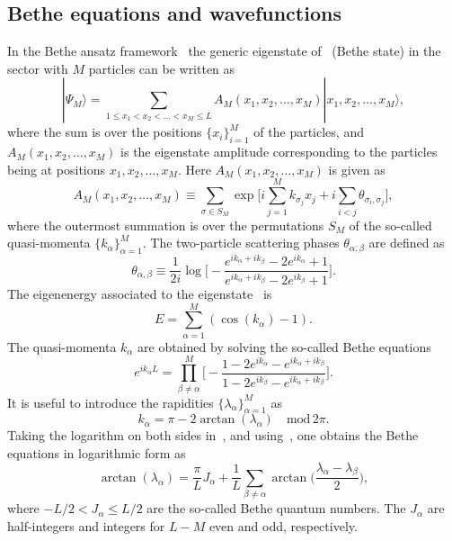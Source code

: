 \documentclass[11pt]{iopart}
\begin{document}
\subsection{Bethe equations and wavefunctions}
\label{sec:1.2}


In the Bethe ansatz framework~\cite{bethe-1931,taka-book} the generic eigenstate 
of~ (Bethe state) in the sector with $M$ particles can be written as 
%
\begin{equation}
\label{ba-eig}
|\Psi_M\rangle=\sum\limits_{1\le x_1<x_2<\dots<x_M\le L}A_M(x_1,x_2,
\dots,x_M)|x_1,x_2,\dots,x_M\rangle,
\end{equation}
%
where the sum is over the positions $\{x_i\}_{i=1}^M$ of the particles, and $A_M(x_1,
x_2,\dots,x_M)$ is the eigenstate amplitude corresponding to the particles 
being at positions $x_1,x_2,\dots, x_M$. Here $A_M(x_1,x_2,\dots, x_M)$ is 
given as 
%
\begin{equation}
\label{ba_amp}
A_M(x_1,x_2,\dots,x_M)\equiv\sum\limits_{\sigma\in S_M}\exp\Big[i
\sum\limits_{j=1}^Mk_{\sigma_j}x_j+i\sum\limits_{i<j}\theta_{\sigma_i,\sigma_j}
\Big], 
\end{equation}
%
where the outermost summation is over the permutations $S_M$ of the so-called 
quasi-momenta $\{k_\alpha\}_{\alpha=1}^M$. The two-particle scattering phases 
$\theta_{\alpha,\beta}$ are defined as 
%
\begin{equation}
\label{s_phases}
\theta_{\alpha,\beta}\equiv \frac{1}{2i}\log\Big[-\frac{e^{ik_\alpha+ik_\beta}-
2e^{ik_\alpha}+1}{e^{ik_\alpha+ik_\beta}-2e^{ik_\beta}+1}\Big].
\end{equation}
%
The eigenenergy associated to the eigenstate~ is  
%
\begin{equation}
\label{ba-ener}
E=\sum\limits_{\alpha=1}^M(\cos(k_\alpha)-1). 
\end{equation}
%
The quasi-momenta $k_\alpha$ are obtained by solving the so-called Bethe 
equations~\cite{bethe-1931}
%
\begin{equation}
\label{ba-eq}
e^{ik_\alpha L}=\prod\limits^M_{\beta\ne\alpha}\Big[-\frac{1-2e^{
ik_\alpha}-e^{ik_\alpha+ik_\beta}}{1-2e^{ik_\beta}-e^{ik_\alpha+
ik_\beta}}\Big].
\end{equation}
%
It is useful to  introduce the rapidities $\{\lambda_\alpha\}_{\alpha=1}^M$ as 
%
\begin{equation}
\label{rap}
k_\alpha=\pi-2\arctan(\lambda_\alpha)\quad\mbox{mod}\, 2\pi.
\end{equation}
%
Taking the logarithm on both sides in~, and using~, 
one obtains the Bethe equations in logarithmic form as 
%
\begin{equation}
\label{ba-eq-log}
\arctan(\lambda_\alpha)=\frac{\pi}{L}J_\alpha+\frac{1}{L}\sum\limits_{
\beta\ne\alpha}\arctan\Big(\frac{\lambda_\alpha-\lambda_\beta}{2}\Big),
\end{equation}
%
where $-L/2<J_\alpha\le L/2$ are the so-called Bethe quantum numbers. The 
$J_\alpha$ are half-integers and integers for $L-M$ even and odd, 
respectively. 
\end{document}
